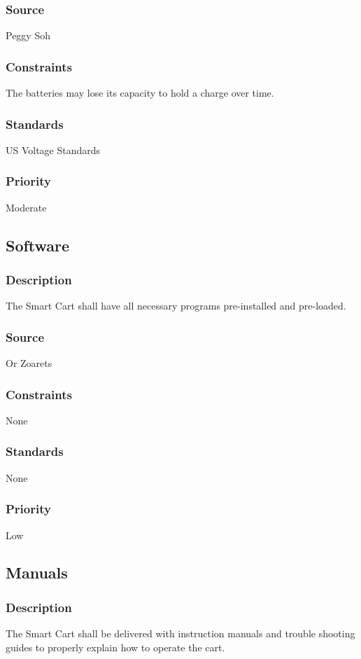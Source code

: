 \subsubsection{Source}
Peggy Soh
\subsubsection{Constraints}
The batteries may lose its capacity to hold a charge over time. 
\subsubsection{Standards}
US Voltage Standards
\subsubsection{Priority}
Moderate


\subsection{Software}
\subsubsection{Description}
The Smart Cart shall have all necessary programs pre-installed and pre-loaded.
\subsubsection{Source}
Or Zoarets
\subsubsection{Constraints}
None
\subsubsection{Standards}
None
\subsubsection{Priority}
Low


\subsection{Manuals}
\subsubsection{Description}
The Smart Cart shall be delivered with instruction manuals and trouble shooting guides to properly explain how to operate the cart. 
